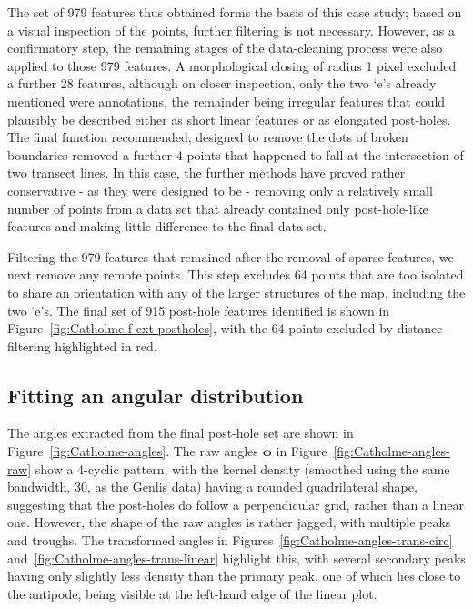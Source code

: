 \documentclass[../../ArchStats.tex]{subfiles}
\begin{document}
The set of 979 features thus obtained forms the basis of this case study; based on a visual inspection of the points, further filtering is not necessary. However, as a confirmatory step, the remaining stages of the data-cleaning process were also applied to those 979 features. A morphological closing of radius 1 pixel excluded a further 28 features, although on closer inspection, only the two `e's already mentioned were annotations, the remainder being irregular features that could plausibly be described either as short linear features or as elongated post-holes. The final function recommended, designed to remove the dots of broken boundaries removed a further 4 points that happened to fall at the intersection of two transect lines. In this case, the further methods have proved rather conservative - as they were designed to be - removing only a relatively small number of points from a data set that already contained only post-hole-like features and making little difference to the final data set.

Filtering the 979 features that remained after the removal of sparse features, we next remove any remote points. This  step excludes 64 points that are too isolated to share an orientation with any of the larger structures of the map, including the two `e's. The final set of 915 post-hole features identified is shown in Figure~\ref{fig:Catholme-f-ext-postholes}, with the 64 points excluded by distance-filtering highlighted in red.




\subsection{Fitting an angular distribution}

The angles extracted from the final post-hole set are shown in Figure~\ref{fig:Catholme-angles}. The raw angles $\boldsymbol{\phi}$ in Figure~\ref{fig:Catholme-angles-raw} show a 4-cyclic pattern, with the kernel density (smoothed using the same bandwidth, 30, as the Genlis data) having a rounded quadrilateral shape, suggesting that the post-holes do follow a perpendicular grid, rather than a linear one. However, the shape of the raw angles is rather jagged, with multiple peaks and troughs. The transformed angles in Figures~\ref{fig:Catholme-angles-trans-circ} and~\ref{fig:Catholme-angles-trans-linear} highlight this, with several secondary peaks having  only slightly less density than the primary peak, one of which lies close to the antipode, being visible at the left-hand edge of the linear plot. 
\end{document}

